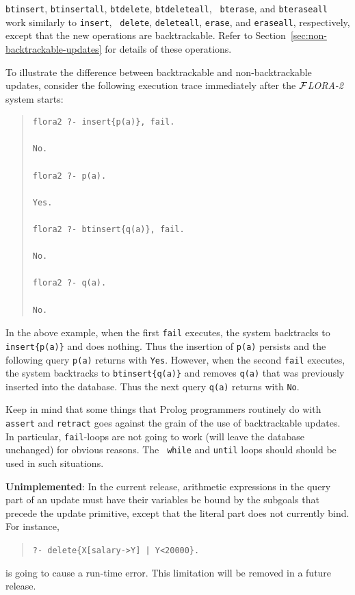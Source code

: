 \documentclass[11pt]{article}
\newcommand{\FLORA}{{\mbox{${\cal F}${\small\it LORA}\rm\emph{-2}}}\xspace}
\begin{document}
{\tt btinsert}, {\tt btinsertall}, {\tt btdelete}, {\tt btdeleteall}, {\tt
  bterase}, and {\tt bteraseall} work similarly to {\tt insert}, {\tt
  delete}, {\tt deleteall}, {\tt erase}, and {\tt eraseall}, respectively,
except that the new operations are backtrackable.  Refer to
Section~\ref{sec:non-backtrackable-updates} for details of these
operations.

To illustrate the difference between backtrackable and
non-backtrackable updates, consider the following execution trace
immediately after the \FLORA system starts:
\begin{quote}
\begin{verbatim}
flora2 ?- insert{p(a)}, fail.

No.

flora2 ?- p(a).

Yes.

flora2 ?- btinsert{q(a)}, fail.

No.

flora2 ?- q(a).

No.
\end{verbatim}
\end{quote}
In the above example, when the first \verb|fail| executes, the system
backtracks to {\tt insert\{p(a)\}} and does nothing. Thus the insertion
of {\tt p(a)} persists and the following query \verb|p(a)| returns
with {\tt Yes}. However, when the second \verb|fail| executes, the
system backtracks to {\tt btinsert\{q(a)\}} and removes {\tt q(a)} that
was previously inserted into the database. Thus the next query
\verb|q(a)| returns with {\tt No}.

Keep in mind that some things that Prolog programmers routinely do with
{\tt assert} and {\tt retract} goes against the grain of the use of
backtrackable updates. In particular, {\tt fail}-loops are not going to
work (will leave the database unchanged) for obvious reasons. The {\tt
  while} and {\tt until} loops should should be used in such situations.

{\bf Unimplemented}: In the current release, arithmetic expressions in the
query part of an update must have their variables be bound by the subgoals
that precede the update primitive, except that the literal part does not
currently bind. For instance, 
\begin{quote}
 \verb!?- delete{X[salary->Y] | Y<20000}.!
\end{quote}
is going to cause a run-time error. This limitation will be removed in a
future release.
\end{document}
